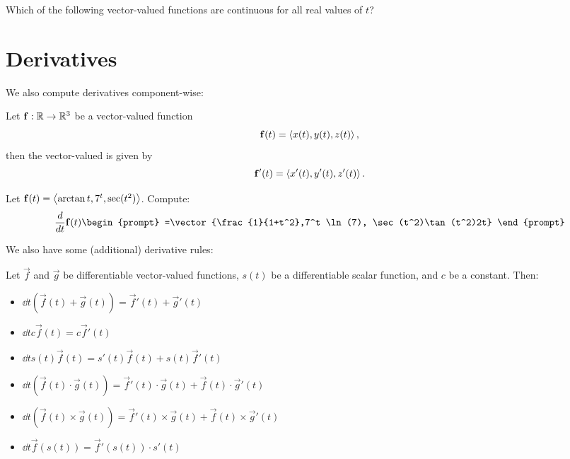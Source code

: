 \documentclass{ximera}
\begin{document}
\begin{question}
Which of the following vector-valued functions are continuous for all
real values of $t$?
\begin{selectAll}
\end{selectAll}
\end{question}


\section{Derivatives}

We also compute derivatives component-wise:

\begin{definition}
  Let $\mathbf{f}:\mathbb R \to \mathbb R^3$ be a vector-valued function
  \[
  \mathbf{f}(t) = \left\langle x(t),y(t),z(t)\right\rangle,
  \]
  then the vector-valued  is given by
  \[
  \mathbf{f}'(t) = \left\langle x'(t),y'(t),z'(t)\right\rangle.
  \]
\end{definition}

\begin{question}
  Let $\mathbf{f}(t) = \left\langle \arctan{t},7^t, \sec(t^2)\right\rangle$.
  Compute:
  \[
  \dd{t} \vec{f}(t)
  \begin{prompt}
    =\vector{\frac{1}{1+t^2},7^t \ln(7), \sec(t^2)\tan(t^2)2t}
  \end{prompt}
  \]
\end{question}

We also have some (additional) derivative rules:
\begin{theorem}
  Let $\vec{f}$ and $\vec{g}$ be differentiable vector-valued
  functions, $s(t)$ be a differentiable scalar function, and $c$ be a
  constant. Then:
  \begin{itemize}
  \item $\dd{t} \left(\vec{f}(t) + \vec{g}(t) \right) = \vec{f}'(t) + \vec{g}'(t)$
  \item $\dd{t} c\vec{f}(t) = c\vec{f}'(t)$
  \item $\dd{t} s(t)\vec{f}(t) = s'(t)\vec{f}(t) + s(t)\vec{f}'(t)$
  \item $\dd{t} \left(\vec{f}(t)\cdot \vec{g}(t)\right) = \vec{f}'(t)\cdot \vec{g}(t) + \vec{f}(t)\cdot\vec{g}'(t)$
  \item $\dd{t} \left(\vec{f}(t)\times \vec{g}(t)\right) = \vec{f}'(t)\times \vec{g}(t) + \vec{f}(t)\times\vec{g}'(t)$
  \item $\dd{t} \vec{f}(s(t)) = \vec{f}'(s(t))\cdot s'(t)$
  \end{itemize}
\end{theorem}
\end{document}
